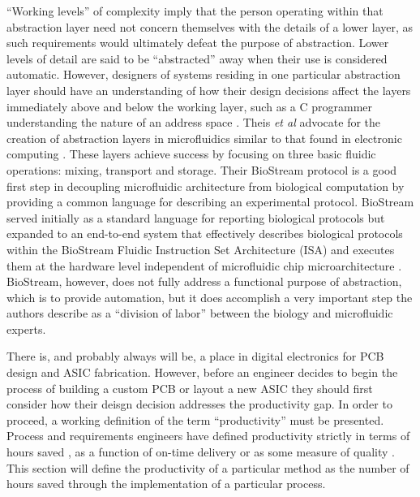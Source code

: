 ``Working levels'' of complexity imply that the person operating within that abstraction layer need not concern themselves with the details of a lower layer, as such requirements would ultimately defeat the purpose of abstraction. Lower levels of detail are said to be ``abstracted'' away when their use is considered automatic. However, designers of systems residing in one particular abstraction layer should have an understanding of how their design decisions affect the layers immediately above and below the working layer, such as a C programmer understanding the nature of an address space \cite{Harris+Harris}. Theis \emph{et al} advocate for the creation of abstraction layers in microfluidics similar to that found in electronic computing \cite{thies2008}. These layers achieve success by focusing on three basic fluidic operations: mixing, transport and storage. Their BioStream protocol is a good first step in decoupling microfluidic architecture from biological computation by providing a common language for describing an experimental protocol. BioStream served initially as a standard language for reporting biological protocols but expanded to an end-to-end system that effectively describes biological protocols within the BioStream Fluidic Instruction Set Architecture (ISA) and executes them at the hardware level independent of microfluidic chip microarchitecture \cite{thies2008}. BioStream, however, does not fully address a functional purpose of abstraction, which is to provide automation, but it does accomplish a very important step the authors describe as a ``division of labor'' between the biology and microfluidic experts. 

There is, and probably always will be, a place in digital electronics for PCB design and ASIC fabrication. However, before an engineer decides to begin the process of building a custom PCB or layout a new ASIC they should first consider how their deisgn decision addresses the productivity gap. In order to proceed, a working definition of the term ``productivity'' must be presented. Process and requirements engineers \cite{Review_ProcessEngr} have defined productivity strictly in terms of hours saved \cite{CostBenefit_hours}, as a function of on-time delivery \cite{OnTimeDelivery} or as some measure of quality \cite{Quality}. This section will define the productivity of a particular method as the number of hours saved through the implementation of a particular process.

